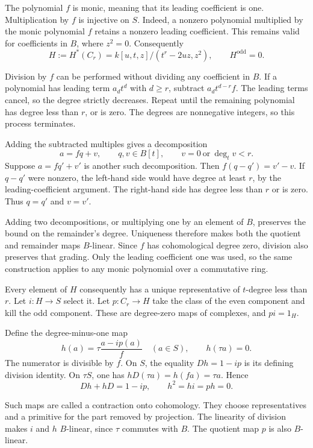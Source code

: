 The polynomial $f$ is monic, meaning that its leading coefficient is one.
Multiplication by $f$ is injective on $S$. Indeed, a nonzero polynomial
multiplied by the monic polynomial $f$ retains a nonzero leading
coefficient. This remains valid for coefficients in $B$, where $z^2=0$.
Consequently
\[
 H:=H^*(C_r)=k[u,t,z]/(t^r-2uz,z^2),
 \qquad H^{\mathrm{odd}}=0.
\]

Division by $f$ can be performed without dividing any coefficient in
$B$. If a polynomial has leading term $a_dt^d$ with $d\geq r$,
subtract $a_dt^{d-r}f$. The leading terms cancel, so the degree
strictly decreases. Repeat until the remaining polynomial has degree
less than $r$, or is zero. The degrees are nonnegative integers,
so this process terminates.

Adding the subtracted multiples gives a decomposition
\[
 a=fq+v,\qquad q,v\in B[t],\qquad
 v=0\ \text{or}\ \deg_t v<r.
\]
Suppose $a=fq'+v'$ is another such decomposition.
Then $f(q-q')=v'-v$. If $q-q'$ were nonzero, the left-hand side
would have degree at least $r$, by the leading-coefficient argument.
The right-hand side has degree less than $r$ or is zero.
Thus $q=q'$ and $v=v'$.

Adding two decompositions, or multiplying one by an element of $B$,
preserves the bound on the remainder's degree. Uniqueness therefore
makes both the quotient and remainder maps $B$-linear.
Since $f$ has cohomological degree zero, division also preserves that
grading. Only the leading coefficient one was used, so the same
construction applies to any monic polynomial over a commutative ring.

Every element of $H$ consequently has a unique representative of
$t$-degree less than $r$. Let $i:H\to S$ select it.
Let $p:C_r\to H$ take the class of the even component and kill the odd
component. These are degree-zero maps of complexes, and $pi=1_H$.

Define the degree-minus-one map
\[
 h(a)=\tau\frac{a-ip(a)}{f}\quad(a\in S),\qquad h(\tau a)=0.
\]
The numerator is divisible by $f$. On $S$, the equality $Dh=1-ip$
is its defining division identity. On $\tau S$, one has
$hD(\tau a)=h(fa)=\tau a$. Hence
\begin{equation}\label{eq:ha-contraction}
 Dh+hD=1-ip,\qquad h^2=hi=ph=0.
\end{equation}

Such maps are called a contraction onto cohomology. They choose
representatives and a primitive for the part removed by projection.
The linearity of division makes $i$ and $h$ $B$-linear, since
$\tau$ commutes with $B$. The quotient map $p$ is also $B$-linear.

